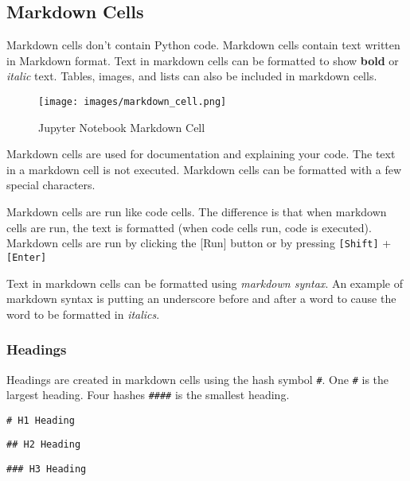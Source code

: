 \documentclass{book}
\makeatletter
\def\maxwidth{\ifdim\Gin@nat@width>\linewidth\linewidth
\else\Gin@nat@width\fi}
\let\Oldincludegraphics\includegraphics
\renewcommand{\includegraphics}[1]{\Oldincludegraphics[width=.8\maxwidth]{#1}}
\newcommand{\passthrough}[1]{#1}
\makeatother
\begin{document}
    
        \hypertarget{markdown-cells}{%
\subsection{Markdown Cells}\label{markdown-cells}}

Markdown cells don't contain Python code. Markdown cells contain text
written in Markdown format. Text in markdown cells can be formatted to
show \textbf{bold} or \emph{italic} text. Tables, images, and lists can
also be included in markdown cells.

\begin{figure}
\centering
\texttt{[image: images/markdown\_cell.png]}
\caption{Jupyter Notebook Markdown Cell}
\end{figure}

Markdown cells are used for documentation and explaining your code. The
text in a markdown cell is not executed. Markdown cells can be formatted
with a few special characters.

Markdown cells are run like code cells. The difference is that when
markdown cells are run, the text is formatted (when code cells run, code
is executed). Markdown cells are run by clicking the {[}Run{]} button or
by pressing \passthrough{\lstinline![Shift]!} +
\passthrough{\lstinline![Enter]!}

Text in markdown cells can be formatted using \emph{markdown syntax}. An
example of markdown syntax is putting an underscore before and after a
word to cause the word to be formatted in \emph{italics}.

\hypertarget{headings}{%
\subsubsection{Headings}\label{headings}}

Headings are created in markdown cells using the hash symbol
\passthrough{\lstinline!#!}. One \passthrough{\lstinline!#!} is the
largest heading. Four hashes \passthrough{\lstinline!####!} is the
smallest heading.

\begin{lstlisting}
# H1 Heading
\end{lstlisting}

\begin{lstlisting}
## H2 Heading
\end{lstlisting}

\begin{lstlisting}
### H3 Heading
\end{lstlisting}
\end{document}

